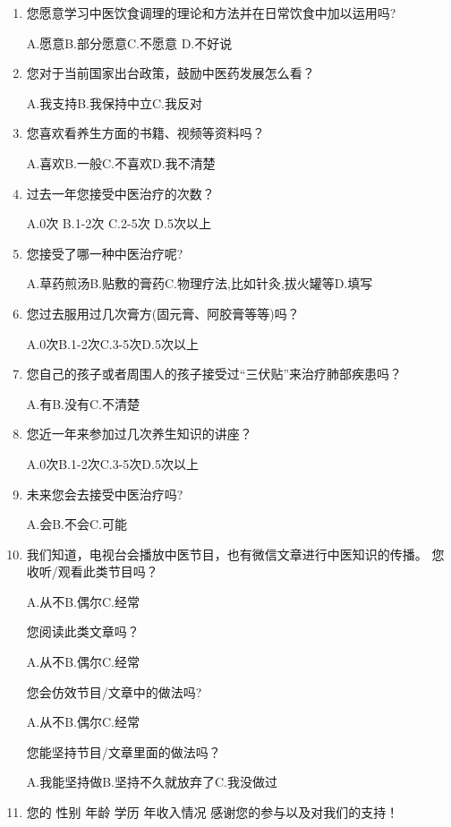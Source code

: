\begin{enumerate}
A.愿意\qquad B.部分愿意\qquad C.不愿意 \qquad D.不好说

\item 您愿意学习中医饮食调理的理论和方法并在日常饮食中加以运用吗?

A.愿意\qquad B.部分愿意\qquad C.不愿意 \qquad D.不好说

\item 
您对于当前国家出台政策，鼓励中医药发展怎么看？

A.我支持\qquad B.我保持中立\qquad C.我反对

\item 您喜欢看养生方面的书籍、视频等资料吗？

A.喜欢\qquad B.一般\qquad C.不喜欢\qquad D.我不清楚

\item
过去一年您接受中医治疗的次数？

A.0次 \qquad
B.1-2次\qquad
C.2-5次\qquad
D.5次以上

\item
您接受了哪一种中医治疗呢?

A.草药煎汤\qquad B.贴敷的膏药\qquad C.物理疗法,比如针灸,拔火罐等\qquad D.填写\underline{\makebox[6em]{}}

\item 您过去服用过几次膏方(固元膏、阿胶膏等等)吗？

A.0次\qquad B.1-2次\qquad C.3-5次\qquad D.5次以上

\item 您自己的孩子或者周围人的孩子接受过“三伏贴”来治疗肺部疾患吗？

A.有\qquad B.没有\qquad C.不清楚

\item 
您近一年来参加过几次养生知识的讲座？

A.0次\qquad B.1-2次\qquad C.3-5次\qquad D.5次以上

\item 
未来您会去接受中医治疗吗?

A.会\qquad B.不会\qquad C.可能

\item 
我们知道，电视台会播放中医节目，也有微信文章进行中医知识的传播。
\subitem 
   您收听/观看此类节目吗？
   
    A.从不\qquad B.偶尔\qquad C.经常

	\subitem 
    您阅读此类文章吗？
	
    A.从不\qquad B.偶尔\qquad C.经常
    
    \subitem 
    您会仿效节目/文章中的做法吗?
	
	A.从不\qquad B.偶尔\qquad C.经常
    
    \subitem 
   您能坚持节目/文章里面的做法吗？
   
    A.我能坚持做\qquad B.坚持不久就放弃了\qquad C.我没做过
    
\item 
您的
性别\underline{\makebox[6em]{}}
年龄\underline{\makebox[6em]{}}
学历\underline{\makebox[6em]{}}
年收入情况\underline{\makebox[6em]{}}
\newline
感谢您的参与以及对我们的支持！
\end{enumerate}
